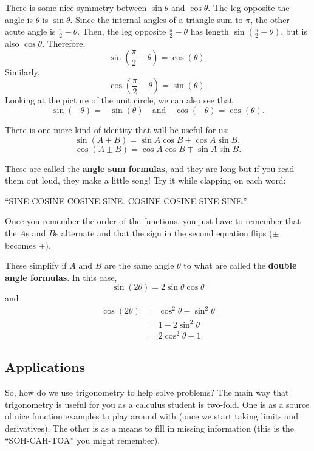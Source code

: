 There is some nice symmetry between $\sin\theta$ and $\cos\theta$. The leg opposite the angle is $\theta$ is $\sin\theta$. Since the internal angles of a triangle sum to $\pi$, the other acute angle is $\frac{\pi}{2} - \theta$.  Then, the leg opposite $\frac{\pi}{2} - \theta$ has length $\sin\left(\frac{\pi}{2} - \theta\right)$, but is also $\cos\theta$. Therefore,
$$\sin\left(\frac{\pi}{2} - \theta\right) = \cos(\theta).$$
Similarly,
$$\cos\left(\frac{\pi}{2} - \theta\right) = \sin(\theta).$$
Looking at the picture of the unit circle, we can also see that
$$\sin(-\theta) = -\sin(\theta)\quad\text{and}\quad \cos(-\theta)=\cos(\theta).$$

There is one more kind of identity that will be useful for us:
$$\sin(A\pm B)=\sin A \cos B \pm \cos A \sin B,$$
$$\cos(A\pm B)=\cos A \cos B \mp \sin A \sin B.$$

These are called the \textbf{angle sum formulas}, and they are long but if you read them out loud, they make a little song! Try it while clapping on each word:
\begin{center}
``SINE-COSINE-COSINE-SINE. COSINE-COSINE-SINE-SINE.''
\end{center}
Once you remember the order of the functions, you just have to remember that the $A$s and $B$s alternate and that the sign in the second equation flips ($\pm$ becomes $\mp$).

These simplify if $A$ and $B$ are the same angle $\theta$ to what are called the \textbf{double angle formulas}. In this case,
$$\sin(2\theta) = 2\sin\theta\cos\theta$$
and
\begin{align*}
\cos(2\theta) & = \cos^2\theta - \sin^2\theta \\
              & = 1 - 2\sin^2\theta \\
              & = 2\cos^2\theta - 1.
\end{align*}

\subsection{Applications}

So, how do we use trigonometry to help solve problems? The main way that trigonometry is useful for you as a calculus student is two-fold. One is as a source of nice function examples to play around with (once we start taking limits and derivatives). The other is as a means to fill in missing information (this is the ``SOH-CAH-TOA'' you might remember).

